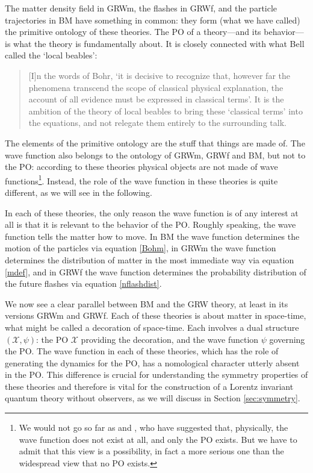 \documentclass[12pt]{article}
\newcommand{\macroX}{\mathscr{X}}
\begin{document}
The matter density field in {\sf GRWm}, the flashes in {\sf GRWf}, and the particle trajectories in {\sf BM} have something in common: they form (what we have called) the primitive ontology of these theories. The PO of a theory---and its behavior--- is what the theory is fundamentally about. 
It is closely connected with what Bell called the `local beables':
\begin{quote}
  [I]n the words of Bohr, `it is decisive to recognize that, however
  far the phenomena transcend the scope of classical physical
  explanation, the account of all evidence must be expressed in
  classical terms'. It is the ambition of the theory of local beables
  to bring these `classical terms' into the equations, and not
  relegate them entirely to the surrounding talk.~\citep{Bell76}
\end{quote}
The elements of the primitive ontology are the stuff that things are made of.
The wave function also belongs to the ontology of {\sf GRWm}, 
{\sf GRWf} and {\sf BM}, 
but not to the PO: according to these theories physical objects are not made of wave functions\footnote{We would not go so far as \citet{Fay04} and 
  \citet{stochmech1}, who have suggested that, physically, the wave function
  does not exist at all, and only the PO exists.  But we have to admit that
  this view is a possibility, in fact a more serious one than the
  widespread view that no PO exists.}. Instead, the role of the wave function in these theories is quite different, as we will see in the following.

In each of these theories, the only
reason the wave function is of any interest at all is that it is relevant to the behavior of the PO. Roughly speaking,
the wave function tells the matter how to move. In {\sf BM} the wave
function determines the motion of the particles via equation \eqref{Bohm}, in {\sf GRWm} the wave function determines the distribution of matter in the most immediate way via equation \eqref{mdef}, and in {\sf GRWf} the wave function determines the probability distribution of the future flashes via equation \eqref{nflashdist}.
 
We now see a clear parallel between {\sf BM} and the {\sf GRW}
theory, at least in its versions {\sf GRWm} and {\sf GRWf}. Each of these theories is about matter in space-time, what might be called a decoration of space-time. Each involves a dual structure $(\macroX,\psi)$: the PO $\macroX$ providing the decoration, and the wave function $\psi$ governing the \textrm{PO}. The wave function in each of these theories, which has the role of generating the dynamics for the PO, has a nomological character utterly absent in the PO. This difference is crucial for understanding the symmetry properties of these theories and therefore is vital for the construction of a Lorentz invariant quantum theory without observers, as we will discuss in Section \ref{sec:symmetry}.
\end{document}
